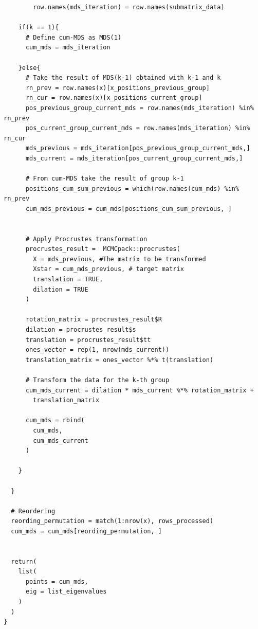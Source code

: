 \documentclass[11pt]{report}
\begin{document}
\begin{lstlisting}
        row.names(mds_iteration) = row.names(submatrix_data)
    
    if(k == 1){
      # Define cum-MDS as MDS(1)
      cum_mds = mds_iteration
      
    }else{
      # Take the result of MDS(k-1) obtained with k-1 and k
      rn_prev = row.names(x)[x_positions_previous_group]  
      rn_cur = row.names(x)[x_positions_current_group] 
      pos_previous_group_current_mds = row.names(mds_iteration) %in% rn_prev 
      pos_current_group_current_mds = row.names(mds_iteration) %in% rn_cur
      mds_previous = mds_iteration[pos_previous_group_current_mds,]  
      mds_current = mds_iteration[pos_current_group_current_mds,]
      
      # From cum-MDS take the result of group k-1
      positions_cum_sum_previous = which(row.names(cum_mds) %in% rn_prev
      cum_mds_previous = cum_mds[positions_cum_sum_previous, ] 
      
      
      # Apply Procrustes transformation
      procrustes_result =  MCMCpack::procrustes(
        X = mds_previous, #The matrix to be transformed
        Xstar = cum_mds_previous, # target matrix
        translation = TRUE, 
        dilation = TRUE
      )
      
      rotation_matrix = procrustes_result$R
      dilation = procrustes_result$s
      translation = procrustes_result$tt
      ones_vector = rep(1, nrow(mds_current)) 
      translation_matrix = ones_vector %*% t(translation)
      
      # Transform the data for the k-th group  
      cum_mds_current = dilation * mds_current %*% rotation_matrix + 
        translation_matrix
      
      cum_mds = rbind(
        cum_mds,
        cum_mds_current
      )
      
    }
    
  }
  
  # Reordering
  reording_permutation = match(1:nrow(x), rows_processed)
  cum_mds = cum_mds[reording_permutation, ]
  
  
  return(
    list(
      points = cum_mds,
      eig = list_eigenvalues 
    )
  )
}
\end{lstlisting}
\end{document}
